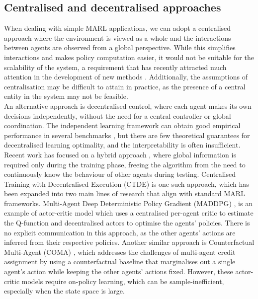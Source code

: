 \documentclass[a4paper,singleside,12pt]{report} %
\begin{document}
\subsection{Centralised and decentralised approaches}\label{cendecenctde}
When dealing with simple MARL applications, we can adopt a centralised approach where the environment is viewed as a whole and the interactions between agents are observed from a global perspective. While this simplifies interactions and makes policy computation easier, it would not be suitable for the scalability of the system, a requirement that has recently attracted much attention in the development of new methods \cite{Gronauer2021MultiagentDR, HernandezLeal2019ASA, Stone2022ASO}. Additionally, the assumptions of centralisation may be difficult to attain in practice, as the presence of a central entity in the system may not be feasible.\\
An alternative approach is decentralised control, where each agent makes its own decisions independently, without the need for a central controller or global coordination. The independent learning framework can obtain good empirical performance in several benchmarks \cite{Papoudakis2020BenchmarkingMD}, but there are few theoretical guarantees for decentralised learning optimality, and the interpretability is often insufficient.
Recent work has focused on a hybrid approach \cite{Lowe2017MultiAgentAF, Foerster2017CounterfactualMP, AAMAS2018VDN, Rashid2018QMIXMV}, where global information is required only during the training phase, freeing the algorithm from the need to continuously know the behaviour of other agents during testing. Centralised Training with Decentralised Execution (CTDE) is one such approach, which has been expanded into two main lines of research that align with standard MARL frameworks. Multi-Agent Deep Deterministic Policy Gradient (MADDPG) \cite{Lowe2017MultiAgentAF}, is an example of actor-critic model which uses a centralised per-agent critic to estimate the Q-function and decentralised actors to optimise the agents' policies. There is no explicit communication in this approach, as the other agents' actions are inferred from their respective policies. Another similar approach is Counterfactual Multi-Agent (COMA) \cite{Foerster2017CounterfactualMP}, which addresses the challenges of multi-agent credit assignment by using a counterfactual baseline that marginalises out a single agent's action while keeping the other agents' actions fixed. However, these actor-critic models require on-policy learning, which can be sample-inefficient, especially when the state space is large.\\
\end{document}
